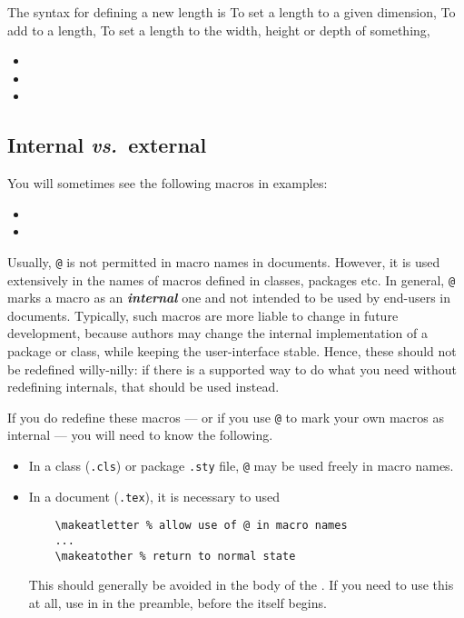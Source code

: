 The syntax for defining a new length is
To set a length to a given dimension,
To add to a length,
To set a length to the width, height or depth of something,
\begin{itemize}
  \item {}
  \item {}
  \item {}
\end{itemize}


\subsection{Internal \protect\emph{vs.}\ external}\label{subsec:intext}


You will sometimes see the following macros in examples:
\begin{itemize}
  \item {}
  \item {}
\end{itemize}
Usually, \verb|@| is not permitted in macro names in documents.
However, it is used extensively in the names of macros defined in classes, packages etc\@.
In general, \verb|@| marks a macro as an \emph{\bfseries internal} one and not intended to be used by end-users in documents.
Typically, such macros are more liable to change in future development, because authors may change the internal implementation of a package or class, while keeping the user-interface stable.
Hence, these should not be redefined willy-nilly: if there is a supported way to do what you need without redefining internals, that should be used instead.

If you do redefine these macros --- or if you use \verb|@| to mark your own macros as internal --- you will need to know the following.
\begin{itemize}
  \item In a class (\verb|.cls|) or package {\verb|.sty|} file, \verb|@| may be used freely in macro names.
  \item In a document (\verb|.tex|), it is necessary to used
  \begin{verbatim}
    \makeatletter % allow use of @ in macro names
    ...
    \makeatother % return to normal state
  \end{verbatim}
  This should generally be avoided in the body of the .
  If you need to use this at all, use in in the preamble, before the  itself begins.
\end{itemize}

